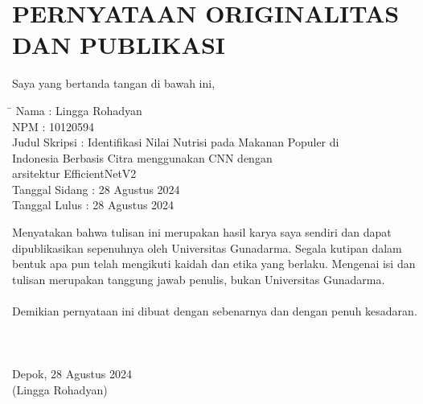 \chapter*{PERNYATAAN ORIGINALITAS DAN PUBLIKASI}

\noindent
Saya yang bertanda tangan di bawah ini,\\
\begin{tabbing}
\hspace{4cm} \= \kill
Nama \>: Lingga Rohadyan \\
NPM \>: 10120594 \\
Judul Skripsi \>: Identifikasi Nilai Nutrisi pada Makanan Populer di\\
 \> Indonesia Berbasis Citra menggunakan CNN dengan \\
 \> arsitektur EfficientNetV2 \\
Tanggal Sidang \>: 28 Agustus 2024\\
Tanggal Lulus \>: 28 Agustus 2024\\
\end{tabbing}
Menyatakan bahwa tulisan ini merupakan hasil karya saya sendiri dan dapat dipublikasikan sepenuhnya oleh Universitas Gunadarma. Segala kutipan dalam bentuk apa pun telah mengikuti kaidah dan etika yang berlaku. Mengenai isi dan tulisan merupakan tanggung jawab penulis, bukan Universitas Gunadarma. \\ \\
Demikian pernyataan ini dibuat dengan sebenarnya dan dengan penuh kesadaran.
\\
\\
\\
\\
Depok, 28 Agustus 2024 \\
(Lingga Rohadyan)

\pagebreak
